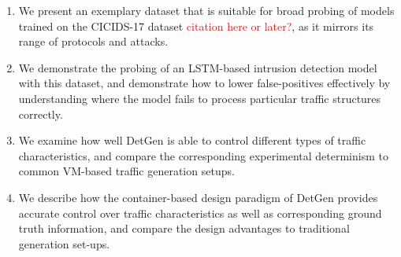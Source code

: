 \documentclass[runningheads]{llncs}
\begin{document}
\begin{enumerate}
\item We present an exemplary dataset that is suitable for broad probing of models trained on the CICIDS-17 dataset \textcolor{red}{citation here or later?}, as it mirrors its range of protocols and attacks.

\item We demonstrate the probing of an LSTM-based intrusion detection model with this dataset, and demonstrate how to lower false-positives effectively by understanding where the model fails to process particular traffic structures correctly.

\item We examine how well DetGen is able to control different types of traffic characteristics, and compare the corresponding experimental determinism to common VM-based traffic generation setups.

\item We describe how the container-based design paradigm of DetGen provides accurate control over traffic characteristics as well as corresponding ground truth information, and compare the design advantages to traditional generation set-ups.





\end{enumerate}
%
%
%
\end{document}
